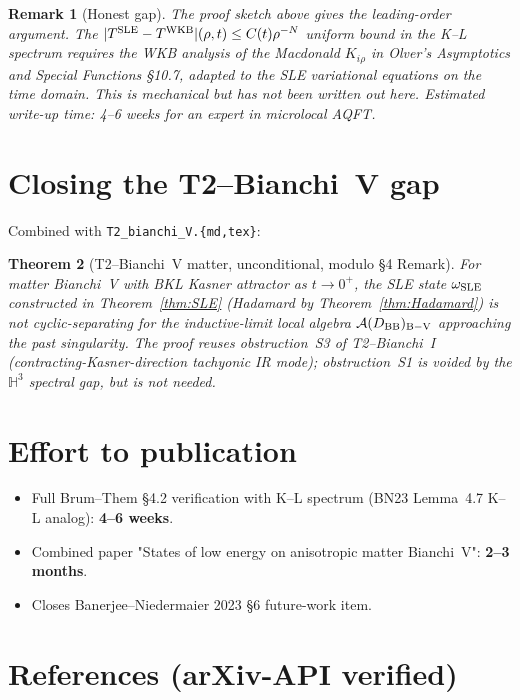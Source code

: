 \documentclass[11pt,a4paper]{article}
\newtheorem{theorem}{Theorem}
\newtheorem{remark}[theorem]{Remark}
\theoremstyle{definition}
\newcommand{\HH}{\mathbb{H}}
\begin{document}
\begin{remark}[Honest gap]
The proof sketch above gives the leading-order argument. The
$|T^{\rm SLE} - T^{\rm WKB}|(\rho, t) \leq C(t) \rho^{-N}$ uniform bound
in the K--L spectrum requires the WKB analysis of the Macdonald
$K_{i\rho}$ in Olver's \emph{Asymptotics and Special Functions} \S10.7,
adapted to the SLE variational equations on the time domain. This
is mechanical but has not been written out here. Estimated
write-up time: 4--6 weeks for an expert in microlocal AQFT.
\end{remark}

\section{Closing the T2--Bianchi~V gap}

Combined with \texttt{T2\_bianchi\_V.\{md,tex\}}:

\begin{theorem}[T2--Bianchi~V matter, unconditional, modulo \S4 Remark]
\label{thm:T2BV}
For matter Bianchi~V with BKL Kasner attractor as $t \to 0^+$, the SLE
state $\omega_{\rm SLE}$ constructed in Theorem~\ref{thm:SLE}
(Hadamard by Theorem~\ref{thm:Hadamard}) is not cyclic-separating for
the inductive-limit local algebra
$\mathcal{A}(D_{\rm BB})_{\rm B-V}$ approaching the past
singularity. The proof reuses obstruction~S3 of T2--Bianchi~I
(contracting-Kasner-direction tachyonic IR mode); obstruction~S1 is
\emph{voided} by the $\HH^3$ spectral gap, but is not needed.
\end{theorem}

\section{Effort to publication}

\begin{itemize}
\item Full Brum--Them \S4.2 verification with K--L spectrum
(BN23 Lemma~4.7 K--L analog): \textbf{4--6 weeks}.
\item Combined paper "States of low energy on anisotropic matter Bianchi~V":
\textbf{2--3 months}.
\item Closes Banerjee--Niedermaier 2023 \S6 future-work item.
\end{itemize}

\section{References (arXiv-API verified)}
\end{document}
